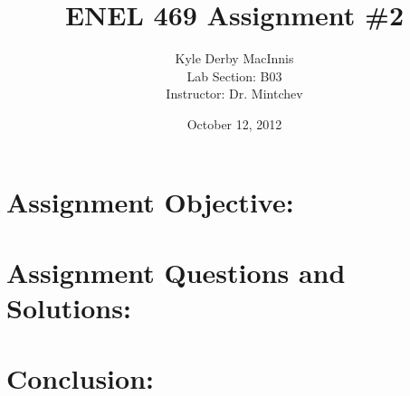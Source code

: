 \documentclass[letter, 12pt]{article}
\title{\bf{ENEL 469 Assignment \#2}}
\author{Kyle Derby MacInnis \\ Lab Section: B03 \\ Instructor: Dr. Mintchev}
\date{October 12, 2012}
\begin{document}
\maketitle

\section*{Assignment Objective:}

\section*{Assignment Questions and Solutions:}

\section*{Conclusion:}
\end{document}
